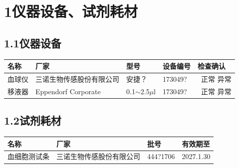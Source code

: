 \documentclass[UTF8,10pt,a4paper,fontset=fandol]{ctexart}
\newcommand{\fieldvalue}[1]{#1}
\newcommand{\handwritten}[1]{#1}
\begin{document}
\section*{1\quad 仪器设备、试剂耗材}

\subsection*{1.1\quad 仪器设备}

\begin{tabularx}{\textwidth}{|l|X|l|l|l|}
\hline
名称 & 厂家 & 型号 & 设备编号 & 检查确认 \\
\hline
\fieldvalue{血球仪} &
\fieldvalue{三诺生物传感股份有限公司} &
\fieldvalue{安捷？} &
\fieldvalue{\handwritten{173049?}} &
\fieldvalue{\handwritten{\checkmark\ 正常}} \quad 异常
\\
\hline
\fieldvalue{移液器} &
\fieldvalue{Eppendorf Corporate} &
\fieldvalue{0.1$\sim$2.5$\mu$l} &
\fieldvalue{\handwritten{173049?}} &
\fieldvalue{\handwritten{\checkmark\ 正常}} \quad 异常
\\
\hline
\end{tabularx}

\subsection*{1.2\quad 试剂耗材}

\begin{tabularx}{\textwidth}{|l|X|l|l|}
\hline
名称 & 厂家 & 批号 & 有效期至 \\
\hline
\fieldvalue{血细胞测试条} &
\fieldvalue{三诺生物传感股份有限公司} &
\fieldvalue{\handwritten{444?1706}} &
\fieldvalue{\handwritten{2027.1.30}}
\\
\hline
\end{tabularx}
\end{document}
